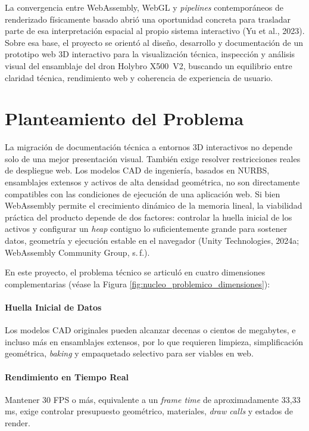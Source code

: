 La convergencia entre WebAssembly, WebGL y \textit{pipelines} contemporáneos de renderizado físicamente basado abrió una oportunidad concreta para trasladar parte de esa interpretación espacial al propio sistema interactivo (Yu et al., 2023). Sobre esa base, el proyecto se orientó al diseño, desarrollo y documentación de un prototipo web 3D interactivo para la visualización técnica, inspección y análisis visual del ensamblaje del dron Holybro X500~V2, buscando un equilibrio entre claridad técnica, rendimiento web y coherencia de experiencia de usuario.

\section*{Planteamiento del Problema}

La migración de documentación técnica a entornos 3D interactivos no depende solo de una mejor presentación visual. También exige resolver restricciones reales de despliegue web. Los modelos CAD de ingeniería, basados en NURBS, ensamblajes extensos y activos de alta densidad geométrica, no son directamente compatibles con las condiciones de ejecución de una aplicación web. Si bien WebAssembly permite el crecimiento dinámico de la memoria lineal, la viabilidad práctica del producto depende de dos factores: controlar la huella inicial de los activos y configurar un \textit{heap} contiguo lo suficientemente grande para sostener datos, geometría y ejecución estable en el navegador (Unity Technologies, 2024a; WebAssembly Community Group, s.\,f.).

En este proyecto, el problema técnico se articuló en cuatro dimensiones complementarias (véase la Figura \ref{fig:nucleo_problemico_dimensiones}):

\paragraph{Huella Inicial de Datos} Los modelos CAD originales pueden alcanzar decenas o cientos de megabytes, e incluso más en ensamblajes extensos, por lo que requieren limpieza, simplificación geométrica, \textit{baking} y empaquetado selectivo para ser viables en web.

\paragraph{Rendimiento en Tiempo Real} Mantener 30 FPS o más, equivalente a un \textit{frame time} de aproximadamente 33,33\,ms, exige controlar presupuesto geométrico, materiales, \textit{draw calls} y estados de render.

